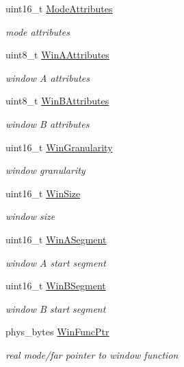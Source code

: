 \begin{DoxyCompactItemize}
uint16\+\_\+t \hyperlink{struct____attribute_____a68ea99ad36679e583fa9674016e30903}{Mode\+Attributes}
\begin{DoxyCompactList}\small\item\em mode attributes \end{DoxyCompactList}\item 
uint8\+\_\+t \hyperlink{struct____attribute_____aeffe4dec59c5a757f65a97a66c812d3b}{Win\+A\+Attributes}
\begin{DoxyCompactList}\small\item\em window A attributes \end{DoxyCompactList}\item 
uint8\+\_\+t \hyperlink{struct____attribute_____ac9e21a3d7d22b24ed82be39f790b1408}{Win\+B\+Attributes}
\begin{DoxyCompactList}\small\item\em window B attributes \end{DoxyCompactList}\item 
uint16\+\_\+t \hyperlink{struct____attribute_____acc2114dbf039909e55cc3966abd3358d}{Win\+Granularity}
\begin{DoxyCompactList}\small\item\em window granularity \end{DoxyCompactList}\item 
uint16\+\_\+t \hyperlink{struct____attribute_____ad26e754fe362f3085c7ec4c0e5e75a6f}{Win\+Size}
\begin{DoxyCompactList}\small\item\em window size \end{DoxyCompactList}\item 
uint16\+\_\+t \hyperlink{struct____attribute_____a7cde26f911e3df97b7498ee139d8de12}{Win\+A\+Segment}
\begin{DoxyCompactList}\small\item\em window A start segment \end{DoxyCompactList}\item 
uint16\+\_\+t \hyperlink{struct____attribute_____a6dbaac9ee1cae36ca0c7b46559264b69}{Win\+B\+Segment}
\begin{DoxyCompactList}\small\item\em window B start segment \end{DoxyCompactList}\item 
phys\+\_\+bytes \hyperlink{struct____attribute_____aa211c2411f48f899b0bb0739ecef0b37}{Win\+Func\+Ptr}
\begin{DoxyCompactList}\small\item\em real mode/far pointer to window function \end{DoxyCompactList}\item 

\end{DoxyCompactItemize}
